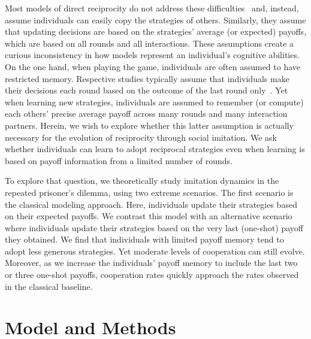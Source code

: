 \documentclass[11pt]{article}
\theoremstyle{plainCl1}
\theoremstyle{plainCl2}
\begin{document}
Most models of direct reciprocity do not address these difficulties~\citep{brauchli:JTB:1999,brandt:JTB:2006,ohtsuki:JTB:2007b,szolnoki:pre:2009b,imhof2010stochastic,vansegbroeck:prl:2012,grujic:jtb:2012,Martinez2012,stewart:pnas:2013,pinheiro:PLoSCB:2014,stewart:games:2015,Baek2016,McAvoy:ProcA:2019,glynatsi:SCR:2020,Schmid:PlosCB:2022,Murase:SciRep:2022,Cooney:BMB:2022,Chen:PNASNexus:2023} and, instead, assume individuals can easily copy the strategies of others. 
Similarly, they assume that updating decisions are based on the strategies' average (or expected) payoffs, which are based on all rounds and all interactions. 
These assumptions create a curious inconsistency in how models represent an individual's cognitive abilities. 
On the one hand, when playing the game, individuals are often assumed to have restricted memory. 
Respective studies typically assume that individuals make their decisions each round based on the outcome of the last round only~\citep[with only a few exceptions, see Refs.]{Hauert1997,vanveelen:PNAS:2012,Stewart2016,hilbe:PNAS:2017,Li:NatCS:2022,Murase:PLoSCompBio:2023a}. 
Yet when learning new strategies, individuals are assumed to remember (or compute) each others' precise average payoff across many rounds and many interaction partners. 
Herein, we wish to explore whether this latter assumption is actually necessary for the evolution of reciprocity through social imitation. 
We ask whether individuals can learn to adopt reciprocal strategies even when learning is based on payoff information from a limited number of rounds. 


To explore that question, we theoretically study imitation dynamics in the repeated prisoner's dilemma, using two extreme scenarios. 
The first scenario is the classical modeling approach. 
Here, individuals update their strategies based on their expected payoffs. 
We contrast this model with an alternative scenario where individuals update their strategies based on the very
last (one-shot) payoff they obtained. 
We find that individuals with limited payoff memory tend to adopt less generous strategies. 
Yet moderate levels of cooperation can still evolve. 
Moreover, as we increase the individuals' payoff memory to include the last two or three one-shot payoffs, cooperation rates quickly approach the rates observed in the classical baseline. 




\section{Model and Methods}\label{section:model}
\end{document}
